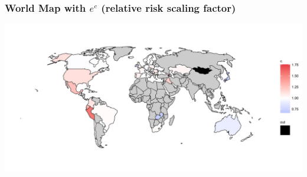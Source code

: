 \documentclass[table,xcdraw,dvipsnames]{beamer}
\begin{document}
\begin{frame}[fragile]\frametitle{World Map with $e^c$ (relative risk scaling factor)}
	\hspace{-2cm}
			\includegraphics[scale=0.8]{Figures/scale_factor_map}
\end{frame}
\end{document}
